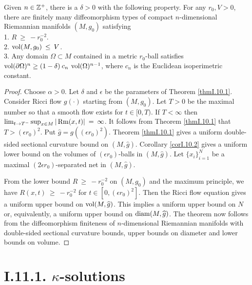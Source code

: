 \begin{theorem}
  \label{thm:kl-diffeomorphism-finiteness-existence-riemannian-metrics}

Given $n \in {\mathbb Z}^+$, there is a $\delta > 0$ with the following property.  For any
$r_0, V > 0$, there are finitely many diffeomorphism types
of compact $n$-dimensional Riemannian manifolds $(M, g_0)$ satisfying \\
1. $R \: \ge \: - r_0^{-2}$. \\
2. $\operatorname{vol}(M, g_0) \: \le \: V$. \\
3. Any domain $\Omega \subset M$ contained in a metric
$r_0$-ball satisfies $\operatorname{vol}(\partial \Omega)^n
\ge (1-\delta) \: c_n \: \operatorname{vol}(\Omega)^{n-1}$, where $c_n$ is the
Euclidean isoperimetric constant.
\end{theorem}
\begin{proof}
Choose $\alpha > 0$. Let $\delta$ and $\epsilon$ be the parameters
of Theorem \ref{thmI.10.1}.
Consider Ricci flow $g(\cdot)$ starting from $(M, g_0)$.
Let $T > 0$ be the maximal number so that a smooth flow exists
for $t \in [0, T)$.  If $T < \infty$ then
$\lim_{t \rightarrow T^-} \sup_{x \in M} |\operatorname{Rm}(x, t)| \: = \: \infty$. It
follows from Theorem \ref{thmI.10.1} that $T > (\epsilon r_0)^2$.
Put $\widehat{g} = g((\epsilon r_0)^2)$. Theorem \ref{thmI.10.1} gives a
uniform double-sided sectional curvature bound on $(M, \widehat{g})$.
Corollary \ref{corI.10.2} gives a uniform lower bound on the volumes
of $(\epsilon r_0)$-balls in $(M, \widehat{g})$. Let $\{x_i\}_{i=1}^N$ be a
maximal $(2\epsilon r_0)$-separated net in $(M, \widehat{g})$.

From the lower bound $R \: \ge \: - r_0^{-2}$ on $(M, g_0)$ and the
maximum principle, we have
$R(x,t)  \: \ge \: - r_0^{-2}$ for $t \in [0, (\epsilon r_0)^2]$.
Then the Ricci flow equation gives
a uniform upper bound on $\operatorname{vol}(M, \widehat{g})$. This implies a uniform
upper bound on $N$ or, equivalently, a uniform upper bound on
$\operatorname{diam}(M, \widehat{g})$. The theorem now follows from the diffeomorphism
finiteness of $n$-dimensional Riemannian
manifolds with double-sided sectional curvature bounds,
upper bounds on diameter and lower bounds on volume.
\end{proof}




\section{I.11.1. $\kappa$-solutions}
\label{secI.11.1}

